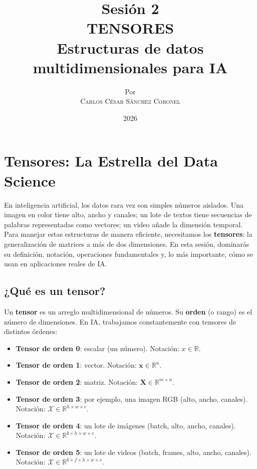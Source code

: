 \documentclass[12pt,a4paper,openany,oneside]{book}
\title{
    \textbf{Sesión 2} \\ 
    \Huge \textbf{TENSORES} \\
    \Large Estructuras de datos multidimensionales para IA \\

}
\author{
    \small Por \\ \vspace{0.2cm}
    \Large \textsc{Carlos César Sánchez Coronel}
}
\date{2026}
\begin{document}
\maketitle
\tableofcontents
{}

\chapter{Tensores: La Estrella del Data Science}

En inteligencia artificial, los datos rara vez son simples números aislados. Una imagen en color tiene alto, ancho y canales; un lote de textos tiene secuencias de palabras representadas como vectores; un video añade la dimensión temporal. Para manejar estas estructuras de manera eficiente, necesitamos los \textbf{tensores}: la generalización de matrices a más de dos dimensiones. En esta sesión, dominarás su definición, notación, operaciones fundamentales y, lo más importante, cómo se usan en aplicaciones reales de IA.

\section{¿Qué es un tensor?}

Un \textbf{tensor} es un arreglo multidimensional de números. Su \textbf{orden} (o rango) es el número de dimensiones. En IA, trabajamos constantemente con tensores de distintos órdenes:

\begin{itemize}
    \item \textbf{Tensor de orden 0}: escalar (un número). Notación: $x \in \mathbb{R}$.
    \item \textbf{Tensor de orden 1}: vector. Notación: $\mathbf{x} \in \mathbb{R}^{n}$.
    \item \textbf{Tensor de orden 2}: matriz. Notación: $\mathbf{X} \in \mathbb{R}^{m \times n}$.
    \item \textbf{Tensor de orden 3}: por ejemplo, una imagen RGB (alto, ancho, canales). Notación: $\mathcal{X} \in \mathbb{R}^{h \times w \times c}$.
    \item \textbf{Tensor de orden 4}: un lote de imágenes (batch, alto, ancho, canales). Notación: $\mathcal{X} \in \mathbb{R}^{b \times h \times w \times c}$.
    \item \textbf{Tensor de orden 5}: un lote de videos (batch, frames, alto, ancho, canales). Notación: $\mathcal{X} \in \mathbb{R}^{b \times f \times h \times w \times c}$.
\end{itemize}
\end{document}
